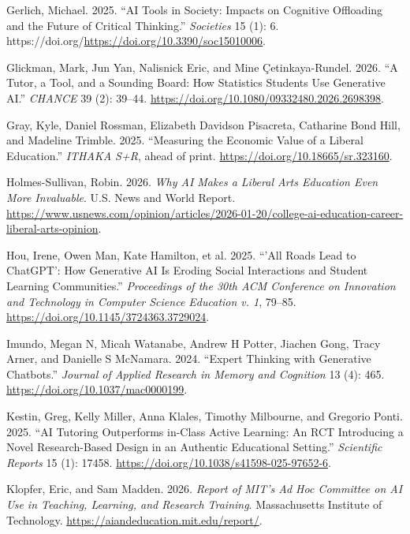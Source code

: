 \documentclass[
]{hdsr}
\newlength{\cslhangindent}
\newenvironment{CSLReferences}[2] %
 {\begin{list}{}{%
  \setlength{\itemindent}{0pt}
  \setlength{\leftmargin}{0pt}
  \setlength{\parsep}{0pt}
  \ifodd #1
   \setlength{\leftmargin}{\cslhangindent}
   \setlength{\itemindent}{-1\cslhangindent}
  \fi
  \setlength{\itemsep}{#2\baselineskip}}}
 {\end{list}}
\begin{document}
\begin{CSLReferences}{1}{1}
Gerlich, Michael. 2025. {``AI Tools in Society: Impacts on Cognitive
Offloading and the Future of Critical Thinking.''} \emph{Societies} 15
(1): 6. https://doi.org/\url{https://doi.org/10.3390/soc15010006}.

Glickman, Mark, Jun Yan, Nalisnick Eric, and Mine Çetinkaya-Rundel.
2026. {``A Tutor, a Tool, and a Sounding Board: How Statistics Students
Use Generative {AI}.''} \emph{CHANCE} 39 (2): 39--44.
\url{https://doi.org/10.1080/09332480.2026.2698398}.

Gray, Kyle, Daniel Rossman, Elizabeth Davidson Pisacreta, Catharine Bond
Hill, and Madeline Trimble. 2025. {``Measuring the Economic Value of a
Liberal Education.''} \emph{ITHAKA S+R}, ahead of print.
\url{https://doi.org/10.18665/sr.323160}.

Holmes-Sullivan, Robin. 2026. \emph{Why {AI} Makes a Liberal Arts
Education Even More Invaluable}. U.S. News and World Report.
\url{https://www.usnews.com/opinion/articles/2026-01-20/college-ai-education-career-liberal-arts-opinion}.

Hou, Irene, Owen Man, Kate Hamilton, et al. 2025. {``'All Roads Lead to
ChatGPT': How Generative {AI} Is Eroding Social Interactions and Student
Learning Communities.''} \emph{Proceedings of the 30th ACM Conference on
Innovation and Technology in Computer Science Education v. 1}, 79--85.
\url{https://doi.org/10.1145/3724363.3729024}.

Imundo, Megan N, Micah Watanabe, Andrew H Potter, Jiachen Gong, Tracy
Arner, and Danielle S McNamara. 2024. {``Expert Thinking with Generative
Chatbots.''} \emph{Journal of Applied Research in Memory and Cognition}
13 (4): 465. \url{https://doi.org/10.1037/mac0000199}.

Kestin, Greg, Kelly Miller, Anna Klales, Timothy Milbourne, and Gregorio
Ponti. 2025. {``{AI} Tutoring Outperforms in-Class Active Learning: An
{RCT} Introducing a Novel Research-Based Design in an Authentic
Educational Setting.''} \emph{Scientific Reports} 15 (1): 17458.
\url{https://doi.org/10.1038/s41598-025-97652-6}.

Klopfer, Eric, and Sam Madden. 2026. \emph{Report of {MIT}'s Ad Hoc
Committee on AI Use in Teaching, Learning, and Research Training}.
Massachusetts Institute of Technology.
\url{https://aiandeducation.mit.edu/report/}.


\end{CSLReferences}
\end{document}
